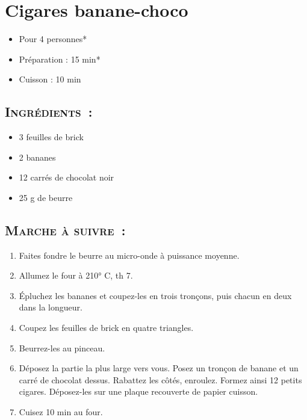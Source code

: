 \section{Cigares banane-choco}

\begin{itemize}
\item Pour 4 personnes*			%
\item Préparation : 15 min*		%
\item Cuisson : 10 min			%
\end{itemize}

\subsection*{\textsc{Ingrédients~:}}

\begin{itemize}
\item 3 feuilles de brick
\item 2 bananes
\item 12 carrés de chocolat noir
\item 25 g de beurre
\end{itemize}


\subsection*{\textsc{Marche à suivre~:}}

\begin{enumerate}
\item Faites fondre le beurre au micro-onde à puissance moyenne. 

\item Allumez le four à 210° C, th 7.

\item Épluchez les bananes et coupez-les en trois tronçons, puis chacun en deux dans la longueur.

\item Coupez les feuilles de brick en quatre triangles. 

\item Beurrez-les au pinceau.

\item Déposez la partie la plus large vers vous. Posez un tronçon de banane et un carré de chocolat dessus. Rabattez les côtés, enroulez. Formez ainsi 12 petits cigares.
Déposez-les sur une plaque recouverte de papier cuisson. 

\item Cuisez 10 min au four.
\end{enumerate}

